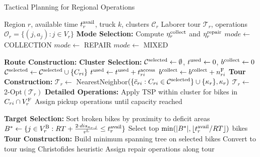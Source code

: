\begin{algorithm}[htbp]
    \caption{Tactical Planning for Regional Operations}
    \label{alg:tactical}
    \begin{algorithmic}[1]
        \Require Region $r$, available time $t^{\text{avail}}_r$, truck $k$, clusters $\mathcal{C}_r$
        \Ensure Laborer tour $\mathcal{T}_r$, operations $\mathcal{O}_r = \{(j, a_j) : j \in V_r\}$
        \State \textbf{Mode Selection:}
        \State Compute $\eta^{\text{collect}}_r$ and $\eta^{\text{repair}}_r$
        \State $mode \leftarrow$ COLLECTION
        \State $mode \leftarrow$ REPAIR
        \Else
        \State $mode \leftarrow$ MIXED
        \EndIf

        \State \textbf{Route Construction:}
        \State \textbf{Cluster Selection:}
        \State $\mathcal{C}^{\text{selected}} \leftarrow \emptyset$, $t^{\text{used}} \leftarrow 0$, $b^{\text{collect}} \leftarrow 0$
        \State $\mathcal{C}^{\text{selected}} \leftarrow \mathcal{C}^{\text{selected}} \cup \{C_{ri}\}$
        \State $t^{\text{used}} \leftarrow t^{\text{used}} + t_{ri}^{\text{access}}$
        \State $b^{\text{collect}} \leftarrow b^{\text{collect}} + n_{ri}^{\text{F}}$
        \EndIf
        \EndFor
        \State \textbf{Tour Construction:}
        \State $\mathcal{T}_r \leftarrow$ NearestNeighbor$(\{\bar{c}_{ri} : C_{ri} \in \mathcal{C}^{\text{selected}}\} \cup \{\kappa_r\}, \kappa_r)$
        \State $\mathcal{T}_r \leftarrow$ 2-Opt$(\mathcal{T}_r)$
        \State \textbf{Detailed Operations:}
        \State Apply TSP within cluster for bikes in $C_{ri} \cap V_r^{\text{F}}$
        \State Assign pickup operations until capacity reached
        \EndFor

        \State \textbf{Target Selection:}
        \State Sort broken bikes by proximity to deficit areas
        \State $B^* \leftarrow \{j \in V_r^{\text{B}} : RT + \frac{2 \cdot dis_{\kappa_r, j}}{v^{\text{L}}} \leq t^{\text{avail}}_r\}$
        \State Select top $\min(|B^*|, \lfloor t^{\text{avail}}_r / RT \rfloor)$ bikes
        \State \textbf{Tour Construction:}
        \State Build minimum spanning tree on selected bikes
        \State Convert to tour using Christofides heuristic
        \State Assign repair operations along tour


\end{algorithmic}
\end{algorithm}
